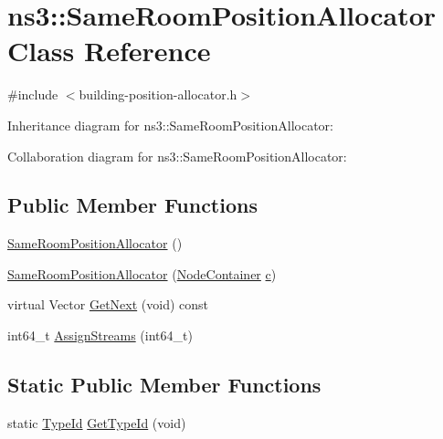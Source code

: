 \hypertarget{classns3_1_1SameRoomPositionAllocator}{}\section{ns3\+:\+:Same\+Room\+Position\+Allocator Class Reference}
\label{classns3_1_1SameRoomPositionAllocator}


{\ttfamily \#include $<$building-\/position-\/allocator.\+h$>$}



Inheritance diagram for ns3\+:\+:Same\+Room\+Position\+Allocator\+:


Collaboration diagram for ns3\+:\+:Same\+Room\+Position\+Allocator\+:
\subsection*{Public Member Functions}
\begin{DoxyCompactItemize}
\item 
\hyperlink{classns3_1_1SameRoomPositionAllocator_a375389873003f74f29e8f8cfb3233551}{Same\+Room\+Position\+Allocator} ()
\item 
\hyperlink{classns3_1_1SameRoomPositionAllocator_a3910053fde8c11824443e7ee5acf2afd}{Same\+Room\+Position\+Allocator} (\hyperlink{classns3_1_1NodeContainer}{Node\+Container} \hyperlink{mmwave_2model_2fading-traces_2fading__trace__generator_8m_ae0323a9039add2978bf5b49550572c7c}{c})
\item 
virtual Vector \hyperlink{classns3_1_1SameRoomPositionAllocator_ae6149d158a31b9962c8a6224d5503c9e}{Get\+Next} (void) const 
\item 
int64\+\_\+t \hyperlink{classns3_1_1SameRoomPositionAllocator_a351c0ab22412170e50984edb0f303269}{Assign\+Streams} (int64\+\_\+t)
\end{DoxyCompactItemize}
\subsection*{Static Public Member Functions}
\begin{DoxyCompactItemize}
\item 
static \hyperlink{classns3_1_1TypeId}{Type\+Id} \hyperlink{classns3_1_1SameRoomPositionAllocator_aebfda3d5331e4f10cf22c932d24b4185}{Get\+Type\+Id} (void)
\end{DoxyCompactItemize}
